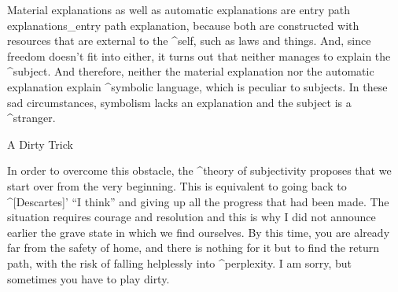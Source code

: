 
Material explanations as well as automatic explanations are entry path
explanations_{entry path explanation}, because both are constructed with
resources that are external to the ^{self}, such as laws and things.
And, since freedom doesn't fit into either, it turns out that neither
manages to explain the ^{subject}. And therefore, neither the material
explanation nor the automatic explanation explain ^{symbolic language},
which is peculiar to subjects. In these sad circumstances, symbolism
lacks an explanation and the subject is a ^{stranger}.


\Section A Dirty Trick

In order to overcome this obstacle, the ^{theory of subjectivity}
proposes that we start over from the very beginning. This is equivalent
to going back to ^[Descartes]' ``I think'' and giving up all the
progress that had been made. The situation requires courage and
resolution and this is why I did not announce earlier the grave state in
which we find ourselves. By this time, you are already far from the
safety of home, and there is nothing for it but to find the return path,
with the risk of falling helplessly into ^{perplexity}. I am sorry, but
sometimes you have to play dirty.


\endinput
